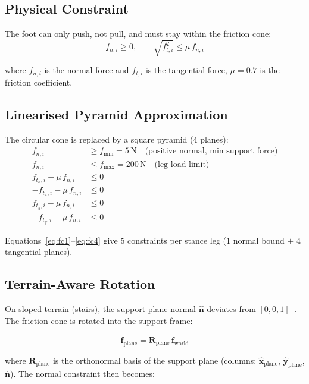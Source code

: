\documentclass[12pt,a4paper]{report}
\newcommand{\vect}[1]{\bm{#1}}
\newcommand{\mat}[1]{\mathbf{#1}}
\begin{document}
\subsection{Physical Constraint}

The foot can only push, not pull, and must stay within the friction cone:
\begin{equation}
    f_{n,i} \geq 0, \qquad \sqrt{f_{t,i}^2} \leq \mu\,f_{n,i}
\end{equation}

where $f_{n,i}$ is the normal force and $f_{t,i}$ is the tangential force,
$\mu = 0.7$ is the friction coefficient.

\subsection{Linearised Pyramid Approximation}

The circular cone is replaced by a square pyramid (4 planes):
\begin{align}
    f_{n,i} &\geq f_\text{min} = 5\,\text{N}
    \quad\text{(positive normal, min support force)} \\
    f_{n,i} &\leq f_\text{max} = 200\,\text{N}
    \quad\text{(leg load limit)} \\
    f_{t_x,i} - \mu\,f_{n,i} &\leq 0 \label{eq:fc1} \\
    -f_{t_x,i} - \mu\,f_{n,i} &\leq 0 \label{eq:fc2} \\
    f_{t_y,i} - \mu\,f_{n,i} &\leq 0 \label{eq:fc3} \\
    -f_{t_y,i} - \mu\,f_{n,i} &\leq 0 \label{eq:fc4}
\end{align}

Equations~\eqref{eq:fc1}--\eqref{eq:fc4} give 5 constraints per stance leg
($1$ normal bound $+$ 4 tangential planes).

\subsection{Terrain-Aware Rotation}

On sloped terrain (stairs), the support-plane normal $\hat{\vect{n}}$ deviates
from $[0,0,1]^\top$.  The friction cone is rotated into the support frame:

\begin{equation}
    \vect{f}_\text{plane} = \mat{R}_\text{plane}^\top\,\vect{f}_\text{world}
\end{equation}

where $\mat{R}_\text{plane}$ is the orthonormal basis of the support plane
(columns: $\hat{\vect{x}}_\text{plane}$, $\hat{\vect{y}}_\text{plane}$,
$\hat{\vect{n}}$).  The normal constraint then becomes:
\end{document}

